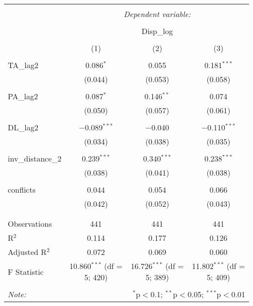 
\begin{table}[!htbp] \centering 
  \caption{} 
  \label{} 
\begin{tabular}{@{\extracolsep{5pt}}lccc} 
\\[-1.8ex]\hline 
\hline \\[-1.8ex] 
 & \multicolumn{3}{c}{\textit{Dependent variable:}} \\ 
\cline{2-4} 
\\[-1.8ex] & \multicolumn{3}{c}{Disp\_log} \\ 
\\[-1.8ex] & (1) & (2) & (3)\\ 
\hline \\[-1.8ex] 
 TA\_lag2 & 0.086$^{*}$ & 0.055 & 0.181$^{***}$ \\ 
  & (0.044) & (0.053) & (0.058) \\ 
  & & & \\ 
 PA\_lag2 & 0.087$^{*}$ & 0.146$^{**}$ & 0.074 \\ 
  & (0.050) & (0.057) & (0.061) \\ 
  & & & \\ 
 DL\_lag2 & $-$0.089$^{***}$ & $-$0.040 & $-$0.110$^{***}$ \\ 
  & (0.034) & (0.038) & (0.035) \\ 
  & & & \\ 
 inv\_distance\_2 & 0.239$^{***}$ & 0.340$^{***}$ & 0.238$^{***}$ \\ 
  & (0.038) & (0.041) & (0.038) \\ 
  & & & \\ 
 conflicts & 0.044 & 0.054 & 0.066 \\ 
  & (0.042) & (0.052) & (0.043) \\ 
  & & & \\ 
\hline \\[-1.8ex] 
Observations & 441 & 441 & 441 \\ 
R$^{2}$ & 0.114 & 0.177 & 0.126 \\ 
Adjusted R$^{2}$ & 0.072 & 0.069 & 0.060 \\ 
F Statistic & 10.860$^{***}$ (df = 5; 420) & 16.726$^{***}$ (df = 5; 389) & 11.802$^{***}$ (df = 5; 409) \\ 
\hline 
\hline \\[-1.8ex] 
\textit{Note:}  & \multicolumn{3}{r}{$^{*}$p$<$0.1; $^{**}$p$<$0.05; $^{***}$p$<$0.01} \\ 
\end{tabular} 
\end{table} 
